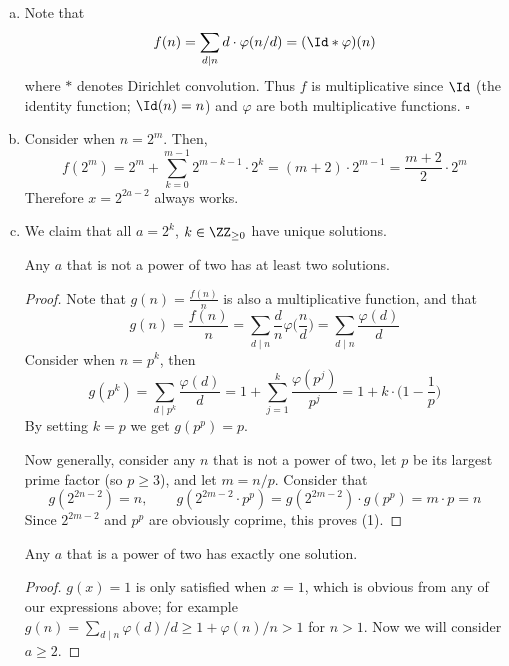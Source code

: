 \begin{solution}\phantom{}
    \begin{enumerate}[(a)]
        \item Note that \[f(n) = \sum_{d \mid n} d \cdot \varphi(n/d) = (\Id * \varphi)(n)\] where $*$ denotes Dirichlet convolution. Thus $f$ is multiplicative since $\Id$ (the identity function; $\Id(n) = n$) and $\varphi$ are both multiplicative functions. $\square$
        
        \item Consider when $n = 2^m$. Then, \[f(2^m) = 2^m + \sum_{k=0}^{m-1} 2^{m-k-1} \cdot 2^k = (m+2) \cdot 2^{m-1} = \frac{m+2}{2} \cdot 2^m\] Therefore $x = 2^{2a-2}$ always works.
        
        \item We claim that all $a = 2^k$, $k \in \ZZ_{\geq0}$ have unique solutions.
        
        \begin{claim*}[1]
        Any $a$ that is not a power of two has at least two solutions.
        \end{claim*}
        \begin{proof}
        Note that $g(n) = \frac{f(n)}{n}$ is also a multiplicative function, and that \[g(n) = \frac{f(n)}{n} = \sum_{d \mid n} \frac{d}{n} \varphi\bigg(\frac{n}{d}\bigg) = \sum_{d \mid n} \frac{\varphi(d)}{d}\] Consider when $n = p^k$, then \[g(p^k) = \sum_{d \mid p^k} \frac{\varphi(d)}{d} = 1 + \sum_{j=1}^k \frac{\varphi(p^j)}{p^j} = 1 + k \cdot \bigg(1 - \frac{1}{p}\bigg)\] By setting $k=p$ we get $g(p^p) = p$.
        
        Now generally, consider any $n$ that is not a power of two, let $p$ be its largest prime factor (so $p \geq 3$), and let $m = n/p$. Consider that \[g(2^{2n-2}) = n, \qquad g(2^{2m-2} \cdot p^p) = g(2^{2m-2}) \cdot g(p^p) = m \cdot p = n\] Since $2^{2m-2}$ and $p^p$ are obviously coprime, this proves (1).
        \end{proof}
        
        \begin{claim*}[2]
        Any $a$ that is a power of two has exactly one solution.
        \end{claim*}
        \begin{proof}
        $g(x) = 1$ is only satisfied when $x = 1$, which is obvious from any of our expressions above; for example $g(n) = \sum_{d \mid n} \varphi(d)/d \geq 1 + \varphi(n)/n > 1$ for $n > 1$. Now we will consider $a \geq 2$.
        

\end{proof}
\end{enumerate}
\end{solution}
